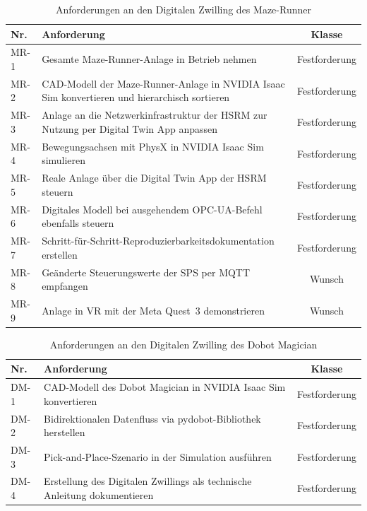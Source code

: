 \begin{table}[H]
\centering
\caption{Anforderungen an den Digitalen Zwilling des Maze-Runner}
\label{tab:anf_mazerunner}
\begin{tabularx}{\textwidth}{lXc}
\toprule
\textbf{Nr.} & \textbf{Anforderung} & \textbf{Klasse} \\
\midrule
MR-1 & Gesamte Maze-Runner-Anlage in Betrieb nehmen                                      & Festforderung \\
MR-2 & CAD-Modell der Maze-Runner-Anlage in NVIDIA Isaac Sim konvertieren und hierarchisch sortieren & Festforderung \\
MR-3 & Anlage an die Netzwerkinfrastruktur der HSRM zur Nutzung per Digital Twin App anpassen      & Festforderung \\
MR-4 & Bewegungsachsen mit PhysX in NVIDIA Isaac Sim simulieren                                    & Festforderung \\
MR-5 & Reale Anlage über die Digital Twin App der HSRM steuern                                     & Festforderung \\
MR-6 & Digitales Modell bei ausgehendem OPC-UA-Befehl ebenfalls steuern               & Festforderung \\
MR-7 & Schritt-für-Schritt-Reproduzierbarkeitsdokumentation erstellen                & Festforderung \\
MR-8 & Geänderte Steuerungswerte der SPS per MQTT empfangen                            & Wunsch \\
MR-9 & Anlage in VR mit der Meta Quest~3 demonstrieren                                 & Wunsch \\
\bottomrule
\end{tabularx}
\end{table}

\begin{table}[H]
\centering
\caption{Anforderungen an den Digitalen Zwilling des Dobot Magician}
\label{tab:anf_dobot}
\begin{tabularx}{\textwidth}{lXc}
\toprule
\textbf{Nr.} & \textbf{Anforderung} & \textbf{Klasse} \\
\midrule
DM-1 & CAD-Modell des Dobot Magician in NVIDIA Isaac Sim konvertieren               & Festforderung \\
DM-2 & Bidirektionalen Datenfluss via pydobot-Bibliothek herstellen               & Festforderung \\
DM-3 & Pick-and-Place-Szenario in der Simulation ausführen                        & Festforderung \\
DM-4 & Erstellung des Digitalen Zwillings als technische Anleitung dokumentieren  & Festforderung \\
\bottomrule
\end{tabularx}
\end{table}

